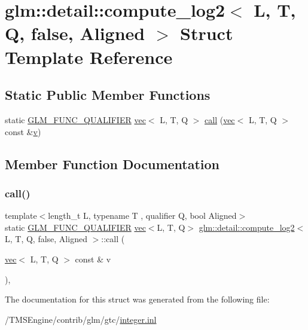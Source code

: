 \hypertarget{structglm_1_1detail_1_1compute__log2_3_01_l_00_01_t_00_01_q_00_01false_00_01_aligned_01_4}{}\section{glm\+:\+:detail\+:\+:compute\+\_\+log2$<$ L, T, Q, false, Aligned $>$ Struct Template Reference}
\label{structglm_1_1detail_1_1compute__log2_3_01_l_00_01_t_00_01_q_00_01false_00_01_aligned_01_4}
\subsection*{Static Public Member Functions}
\begin{DoxyCompactItemize}
\item 
static \hyperlink{setup_8hpp_a33fdea6f91c5f834105f7415e2a64407}{G\+L\+M\+\_\+\+F\+U\+N\+C\+\_\+\+Q\+U\+A\+L\+I\+F\+I\+ER} \hyperlink{structglm_1_1vec}{vec}$<$ L, T, Q $>$ \hyperlink{structglm_1_1detail_1_1compute__log2_3_01_l_00_01_t_00_01_q_00_01false_00_01_aligned_01_4_ac62f752297dfcc4f1778e504cce4e305}{call} (\hyperlink{structglm_1_1vec}{vec}$<$ L, T, Q $>$ const \&\hyperlink{_s_d_l__opengl_8h_a10a82eabcb59d2fcd74acee063775f90}{v})
\end{DoxyCompactItemize}


\subsection{Member Function Documentation}
\mbox{\label{structglm_1_1detail_1_1compute__log2_3_01_l_00_01_t_00_01_q_00_01false_00_01_aligned_01_4_ac62f752297dfcc4f1778e504cce4e305}} 
\subsubsection{\texorpdfstring{call()}{call()}}
{\footnotesize\ttfamily template$<$length\+\_\+t L, typename T , qualifier Q, bool Aligned$>$ \\
static \hyperlink{setup_8hpp_a33fdea6f91c5f834105f7415e2a64407}{G\+L\+M\+\_\+\+F\+U\+N\+C\+\_\+\+Q\+U\+A\+L\+I\+F\+I\+ER} \hyperlink{structglm_1_1vec}{vec}$<$L, T, Q$>$ \hyperlink{structglm_1_1detail_1_1compute__log2}{glm\+::detail\+::compute\+\_\+log2}$<$ L, T, Q, false, Aligned $>$\+::call (\begin{DoxyParamCaption}\item[{\hyperlink{structglm_1_1vec}{vec}$<$ L, T, Q $>$ const \&}]{v }\end{DoxyParamCaption})\hspace{0.3cm}{\ttfamily [inline]}, {\ttfamily [static]}}



The documentation for this struct was generated from the following file\+:\begin{DoxyCompactItemize}
\item 
/\+T\+M\+S\+Engine/contrib/glm/gtc/\hyperlink{gtc_2integer_8inl}{integer.\+inl}\end{DoxyCompactItemize}
